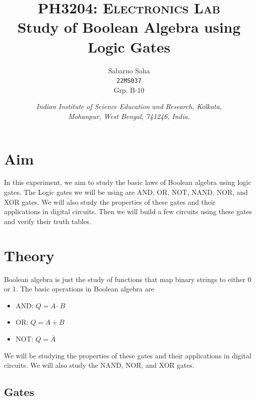\documentclass{scrartcl}
\title{
        \Large\textsc{PH3204: Electronics Lab} \\
        \vspace{10pt}
        \Huge \textbf{Study of Boolean Algebra using Logic Gates} \\
}
\author{Sabarno Saha \\ \texttt{22MS037} \\ Grp. B-10}
\date{\normalsize
        \textit{Indian Institute of Science Education and Research, Kolkata, \\
        Mohanpur, West Bengal, 741246, India.}
}
\newcommand{\1}{\mathbbm{1}}
\begin{document}
\maketitle
\tableofcontents
\section{Aim}
In this experiment, we aim to study the basic laws of Boolean algebra using logic gates. The Logic gates we will be using are
AND, OR, NOT, NAND, NOR, and XOR gates. We will also study the properties of these gates and their applications in digital circuits. Then 
we will build a few circuits using these gates and verify their truth tables.
\section{Theory}
Boolean algebra is just the study of functions that map binary strings to either 0 or 1. The basic operations in Boolean algebra are
\begin{itemize}
    \item AND: $Q = A \cdot B$
    \item OR: $Q = A + B$
    \item NOT: $Q = \overline{A}$
\end{itemize}
We will be studying the properties of these gates and their applications in digital circuits. We will also study the NAND, NOR, and XOR gates.
\subsection{Gates}
\end{document}
